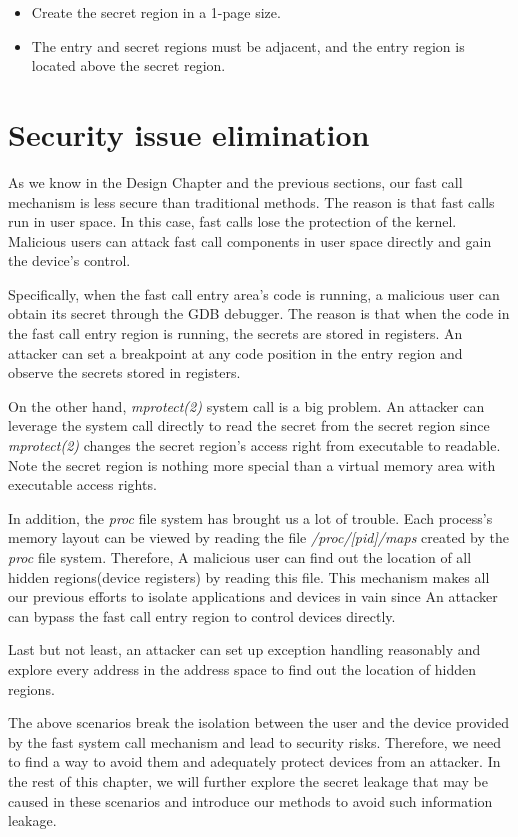 \begin{itemize}
  \item Create the secret region in a 1-page size.
  \item The entry and secret regions must be adjacent, and the entry region is located above the secret region.
\end{itemize}


\section{Security issue elimination}

As we know in the Design Chapter and the previous sections, our fast call 
mechanism is less secure than traditional methods. The reason is that fast 
calls run in user space. In this case, fast calls lose the protection of the kernel. Malicious users can attack fast call components in user space directly and gain the device's control.


Specifically, when the fast call entry area's code is running, a malicious 
user can obtain its secret through the GDB debugger. The reason is that when 
the code in the fast call entry region is running, the secrets are stored in 
registers. An attacker can set a breakpoint at any code position in the entry
 region and observe the secrets stored in registers.

On the other hand, \emph{mprotect(2)} system call is a big problem. An attacker 
can leverage the system call directly to read the secret from the secret 
region since \emph{mprotect(2)} changes the secret region's access right from 
executable to readable.  Note the secret region is nothing more special 
than a virtual memory area with executable access rights. 

In addition, the \emph{proc} file system has brought us a lot of trouble. 
Each process's memory layout can be viewed by reading the file \emph{/proc/[pid]/maps} 
created by the \emph{proc} file system. Therefore,  A malicious user can find out the 
location of all hidden regions(device registers) by reading this file. This 
mechanism makes all our previous efforts to isolate applications and devices 
in vain since An attacker can bypass the fast call entry region to control 
devices directly.  

Last but not least, an attacker can set up exception handling reasonably and 
explore every address in the address space to find out the location of hidden 
regions. 

The above scenarios break the isolation between the user and the device 
provided by the fast system call mechanism and lead to security risks. 
Therefore, we need to find a way to avoid them and adequately protect 
devices from an attacker. In the rest of this chapter, we will further 
explore the secret leakage that may be caused in these scenarios and 
introduce our methods to avoid such information leakage.

